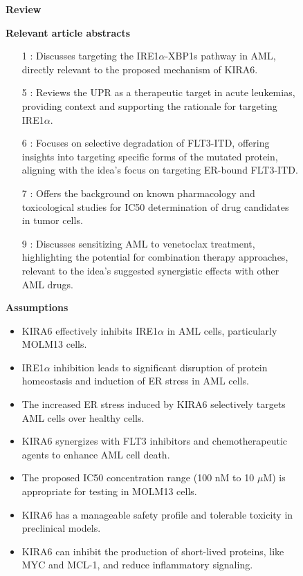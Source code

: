 \begin{figure}[htbp!]
\begin{tcolorbox}[
    colback=black!5!white,
    colframe=black!60!white,
    title=\textbf{KIRA6 for AML (continued)},
    fonttitle=\bfseries,
    arc=3mm,
    boxrule=1pt,
    bottomrule=2pt,
]
\scriptsize
\textbf{Review}

\textbf{Relevant article abstracts}
\begin{itemize}
\item [1]: Discusses targeting the IRE1$\alpha$-XBP1s pathway in AML, directly relevant to the proposed mechanism of KIRA6.
\item [5]: Reviews the UPR as a therapeutic target in acute leukemias, providing context and supporting the rationale for targeting IRE1$\alpha$.
\item [6]: Focuses on selective degradation of FLT3-ITD, offering insights into targeting specific forms of the mutated protein, aligning with the idea's focus on targeting ER-bound FLT3-ITD.
\item [7]: Offers the background on known pharmacology and toxicological studies for IC50 determination of drug candidates in tumor cells.
\item [9]: Discusses sensitizing AML to venetoclax treatment, highlighting the potential for combination therapy approaches, relevant to the idea's suggested synergistic effects with other AML drugs.
\end{itemize}

\textbf{Assumptions}
\begin{itemize}
    \item KIRA6 effectively inhibits IRE1$\alpha$ in AML cells, particularly MOLM13 cells.
    \item IRE1$\alpha$ inhibition leads to significant disruption of protein homeostasis and induction of ER stress in AML cells.
    \item The increased ER stress induced by KIRA6 selectively targets AML cells over healthy cells.
    \item KIRA6 synergizes with FLT3 inhibitors and chemotherapeutic agents to enhance AML cell death.
    \item The proposed IC50 concentration range (100 nM to 10 $\mu$M) is appropriate for testing in MOLM13 cells.
    \item KIRA6 has a manageable safety profile and tolerable toxicity in preclinical models.
    \item KIRA6 can inhibit the production of short-lived proteins, like MYC and MCL-1, and reduce inflammatory signaling.
\end{itemize}


\end{tcolorbox}
\end{figure}
